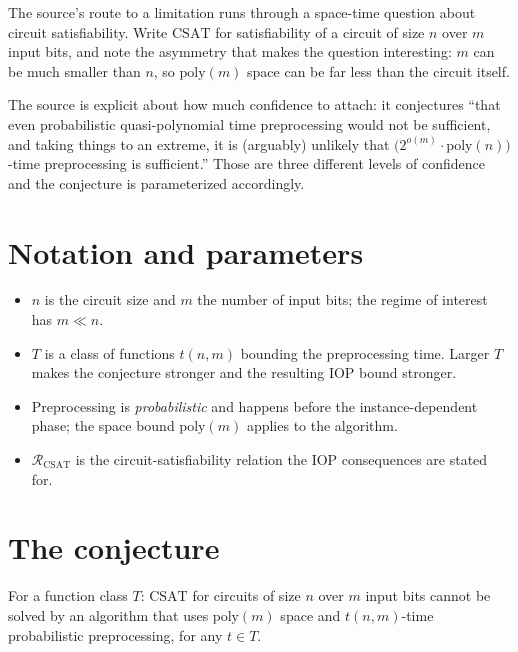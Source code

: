\documentclass{aicr-conjecture}
\newcommand{\CSAT}{\mathrm{CSAT}}
\newcommand{\RCSAT}{\mathcal{R}_{\mathrm{CSAT}}}
\begin{document}
The source's route to a limitation runs through a space-time question
about circuit satisfiability. Write $\CSAT$ for satisfiability of a
circuit of size $n$ over $m$ input bits, and note the asymmetry that
makes the question interesting: $m$ can be much smaller than $n$, so
$\mathrm{poly}(m)$ space can be far less than the circuit itself.

The source is explicit about how much confidence to attach: it conjectures
``that even probabilistic quasi-polynomial time preprocessing would not
be sufficient, and taking things to an extreme, it is (arguably) unlikely
that $\bigl(2^{o(m)}\cdot\mathrm{poly}(n)\bigr)$-time preprocessing is
sufficient.'' Those are three different levels of confidence and the
conjecture is parameterized accordingly.

\section{Notation and parameters}\label{sec:notation}

\begin{itemize}[nosep]
  \item $n$ is the circuit size and $m$ the number of input bits; the
    regime of interest has $m \ll n$.
  \item $T$ is a class of functions $t(n,m)$ bounding the preprocessing
    time. Larger $T$ makes the conjecture stronger and the resulting IOP
    bound stronger.
  \item Preprocessing is \emph{probabilistic} and happens before the
    instance-dependent phase; the space bound $\mathrm{poly}(m)$ applies
    to the algorithm.
  \item $\RCSAT$ is the circuit-satisfiability relation the IOP
    consequences are stated for.
\end{itemize}

\section{The conjecture}\label{sec:conjectures}

\begin{conjecture}[{\cite[Conjecture 1.2]{NR22}}]\label{conj:main}
For a function class $T$: $\CSAT$ for circuits of size $n$ over $m$ input
bits cannot be solved by an algorithm that uses $\mathrm{poly}(m)$ space
and $t(n,m)$-time probabilistic preprocessing, for any $t \in T$.
\end{conjecture}
\end{document}
